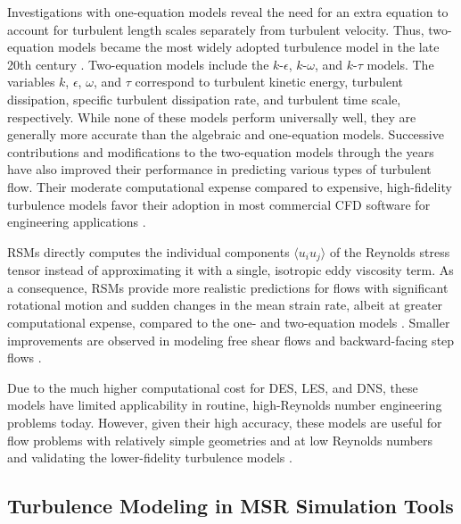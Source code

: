Investigations with
one-equation models reveal the need for an extra equation to account for
turbulent length scales separately from turbulent velocity. Thus, two-equation
models became the most widely adopted turbulence model in the late 20th century
\cite{pope_turbulent_2000}. Two-equation models include the $k$-$\epsilon$,
$k$-$\omega$, and $k$-$\tau$ models. The variables $k$, $\epsilon$, $\omega$,
and $\tau$ correspond to turbulent kinetic energy, turbulent dissipation,
specific turbulent dissipation rate, and turbulent time scale, respectively.
While none of these models perform universally well, they are generally more
accurate than the algebraic and one-equation models. Successive contributions
and modifications to the two-equation models through the years have also
improved their performance in predicting various types of turbulent flow. Their
moderate computational expense compared to expensive, high-fidelity turbulence
models favor their adoption in most commercial \gls{CFD} software for
engineering applications \cite{pope_turbulent_2000}.

\glspl{RSM} directly computes the individual components $\langle u_i u_j
\rangle$ of the Reynolds stress tensor instead of approximating it with a
single, isotropic eddy viscosity term. As a consequence, \glspl{RSM} provide
more realistic predictions for flows with significant rotational motion and
sudden changes in the mean strain rate, albeit at greater computational
expense, compared to the one- and two-equation models
\cite{wilcox_turbulence_2006}. Smaller improvements are observed in modeling
free shear flows and backward-facing step flows \cite{wilcox_turbulence_2006}.

Due to the much higher computational cost for \gls{DES}, \gls{LES}, and
\gls{DNS}, these models have limited applicability in routine, high-Reynolds
number engineering problems today. However, given their high accuracy, these
models are useful for flow problems with relatively simple geometries and at
low Reynolds numbers and validating the lower-fidelity turbulence models
\cite{zhiyin_large-eddy_2015}.

\subsection{Turbulence Modeling in MSR Simulation Tools}

